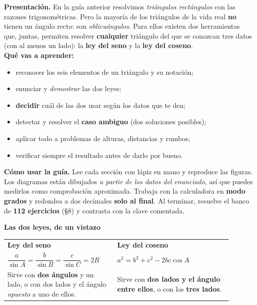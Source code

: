 \documentclass[12pt, letterpaper]{article}
\providecommand{\sen}{\sin}
\begin{document}


\vspace{4pt}
\begin{cuadroinfo}
  \small
  \textbf{Presentación.} En la guía anterior resolvimos \emph{triángulos
  rectángulos} con las razones trigonométricas. Pero la mayoría de los
  triángulos de la vida real \textbf{no} tienen un ángulo recto: son
  \emph{oblicuángulos}. Para ellos existen dos herramientas que, juntas,
  permiten resolver \textbf{cualquier} triángulo del que se conozcan tres
  datos (con al menos un lado): la \textbf{ley del seno} y la
  \textbf{ley del coseno}.
  \\[4pt]
  \textbf{Qué vas a aprender:}
  \begin{itemize}[leftmargin=1.2em, nosep, topsep=2pt]
    \item reconocer los seis elementos de un triángulo y su notación;
    \item enunciar y \emph{demostrar} las dos leyes;
    \item \textbf{decidir} cuál de las dos usar según los datos que te den;
    \item detectar y resolver el \textbf{caso ambiguo} (dos soluciones posibles);
    \item aplicar todo a problemas de alturas, distancias y rumbos;
    \item verificar siempre el resultado antes de darlo por bueno.
  \end{itemize}
  \par\medskip
  \textbf{Cómo usar la guía.} Lee cada sección con lápiz en mano y reproduce
  las figuras. Los diagramas están dibujados \emph{a partir de los datos del
  enunciado}, así que puedes medirlos como comprobación aproximada. Trabaja con
  la calculadora en \textbf{modo grados} y redondea a dos decimales
  \textbf{solo al final}. Al terminar, resuelve el banco de \textbf{112
  ejercicios} (§8) y contrasta con la clave comentada.
\end{cuadroinfo}

\begin{cuadroteoria}
  \small
  \textbf{Las dos leyes, de un vistazo}\\[4pt]
  \begin{tabular}{@{}p{0.44\linewidth} p{0.46\linewidth}@{}}
    \textbf{Ley del seno} & \textbf{Ley del coseno} \\[2pt]
    $\dfrac{a}{\sen A}=\dfrac{b}{\sen B}=\dfrac{c}{\sen C}=2R$ &
    $a^{2}=b^{2}+c^{2}-2bc\cos A$ \\[6pt]
    Sirve con \textbf{dos ángulos} y un lado, o con dos lados y el ángulo
    \emph{opuesto} a uno de ellos. &
    Sirve con \textbf{dos lados y el ángulo entre ellos}, o con los
    \textbf{tres lados}. \\
  \end{tabular}
\end{cuadroteoria}
\end{document}
